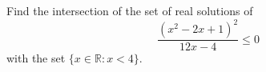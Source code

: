 Find the intersection of the set of real solutions of
\[\dfrac{\left(x^2-2x+1\right)^2}{12x-4}\le0\]
with the set $\{x\in\mathbb R: x<4\}$.
